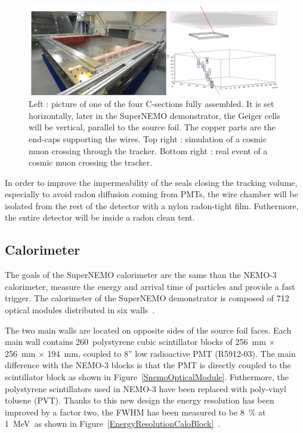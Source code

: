 \documentclass[main.tex]{subfiles}
\begin{document}
\begin{figure}[h!]
\begin{center}
\includegraphics[scale=0.25]{pictures/Chap3/TrackerTestCosmic.png}
\caption{Left : picture of one of the four C-sections fully assembled. It is set horizontally, later in the SuperNEMO demonstrator, the Geiger cells will be vertical, parallel to the source foil. The copper parts are the end-caps supporting the wires. Top right : simulation of a cosmic muon crossing through the tracker. Bottom right : real event of a cosmic muon crossing the tracker.}
\label{SnemoTracker}
\end{center}
\end{figure}


\NI In order to improve the impermeability of the seals closing the tracking volume, especially to avoid radon diffusion coming from PMTs, the wire chamber will be isolated from the rest of the detector with a nylon radon-tight film. Futhermore, the entire detector will be inside a radon clean tent.


\FloatBarrier


\subsection{Calorimeter}


\NI The goals of the SuperNEMO calorimeter are the same than the NEMO-3 calorimeter, measure the energy and arrival time of particles and provide a fast trigger. The calorimeter of the SuperNEMO demonstrator is composed of 712 optical modules distributed in six walls~\cite{SNCalorimeter}.


\bigskip


\NI The two main walls are located on opposite sides of the source foil faces. Each main wall contains 260~polystyrene cubic scintillator blocks of 256~mm $\times$ 256~mm $\times$ 194~mm, coupled to 8'' low radioactive PMT (R5912-03). The main difference with the NEMO-3 blocks is that the PMT is directly coupled to the scintillator block as shown in Figure~\ref{SnemoOpticalModule}. Futhermore, the polystyrene scintillators used in NEMO-3 have been replaced with poly-vinyl toluene (PVT). Thanks to this new design the energy resolution has been improved by a factor two, the FWHM has been measured to be 8~\% at 1~MeV~as shown in Figure~\ref{EnergyResolutionCaloBlock}~\cite{SNCalorimeter}.
\end{document}
